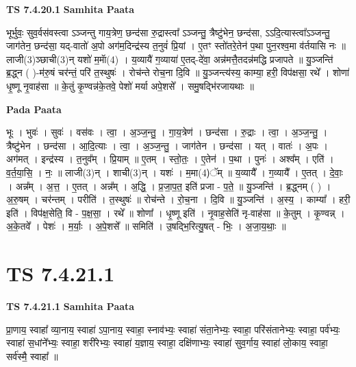 \documentclass[17pt]{extarticle}
\begin{document}
\textbf{TS 7.4.20.1 } \newline
\textbf{Samhita Paata} \newline

भूर्भुवः॒ सुव॒र्वस॑वस्त्वा ऽञ्जन्तु गाय॒त्रेण॒ छन्द॑सा रु॒द्रास्त्वा᳚ ऽञ्जन्तु॒ त्रैष्टु॑भेन॒ छन्द॑सा, ऽऽदि॒त्यास्त्वा᳚ऽञ्जन्तु॒ जाग॑तेन॒ छन्द॑सा॒ यद्-वातो॑ अ॒पो अग॑म॒दिन्द्र॑स्य त॒नुवं॑ प्रि॒यां । ए॒तꣳ स्तो॑तरे॒तेन॑ प॒था पुन॒रश्व॒मा व॑र्तयासि नः ॥ लाजी(3)ञ्छाची(3)न् यशो॑ म॒माॅ(4) । य॒व्यायै॑ ग॒व्याया॑ ए॒तद्-दे॑वा॒ अन्न॑मत्तै॒तदन्न॑मद्धि प्रजापते ॥ यु॒ञ्जन्ति॑ ब्र॒द्ध्न ( )-म॑रु॒षं चर॑न्तं॒ परि॑ त॒स्थुषः॑ । रोच॑न्ते रोच॒ना दि॒वि ॥ यु॒ञ्जन्त्य॑स्य॒ काम्या॒ हरी॒ विप॑क्षसा॒ रथे᳚ । शोणा॑ धृ॒ष्णू नृ॒वाह॑सा ॥ के॒तुं कृ॒ण्वन्न॑के॒तवे॒ पेशो॑ मर्या अपे॒शसे᳚ । समु॒षद्भि॑रजायथाः ॥ \newline

\textbf{Pada Paata} \newline

भूः । भुवः॑ । सुवः॑ । वस॑वः । त्वा॒ । अ॒ञ्ज॒न्तु॒ । गा॒य॒त्रेण॑ । छन्द॑सा । रु॒द्राः । त्वा॒ । अ॒ञ्ज॒न्तु॒ । त्रैष्टु॑भेन । छन्द॑सा । आ॒दि॒त्याः । त्वा॒ । अ॒ञ्ज॒न्तु॒ । जाग॑तेन । छन्द॑सा । यत् । वातः॑ । अ॒पः । अग॑मत् । इन्द्र॑स्य । त॒नुव᳚म् । प्रि॒याम् ॥ ए॒तम् । स्तो॒तः॒ । ए॒तेन॑ । प॒था । पुनः॑ । अश्व᳚म् । एति॑ । व॒र्त॒या॒सि॒ । नः॒ ॥ लाजी(3)न् । शाची(3)न् । यशः॑ । म॒मा(4)ॅम् ॥ य॒व्यायै᳚ । ग॒व्यायै᳚ । ए॒तत् । दे॒वाः॒ । अन्न᳚म् । अ॒त्त॒ । ए॒तत् । अन्न᳚म् । अ॒द्धि॒ । प्र॒जा॒प॒त॒ इति॑ प्रजा - प॒ते॒ ॥ यु॒ञ्जन्ति॑ । ब्र॒द्ध्नम् ( ) । अ॒रु॒षम् । चर॑न्तम् । परीति॑ । त॒स्थुषः॑ ॥ रोच॑न्ते । रो॒च॒ना । दि॒वि ॥ यु॒ञ्जन्ति॑ । अ॒स्य॒ । काम्या᳚ । हरी॒ इति॑ । विप॑क्ष॒सेति॒ वि - प॒क्ष॒सा॒ । रथे᳚ ॥ शोणा᳚ । धृ॒ष्णू इति॑ । नृ॒वाह॒सेति॑ नृ-वाह॑सा ॥ के॒तुम् । कृ॒ण्वन्न् । अ॒के॒तवे᳚ । पेशः॑ । म॒र्याः॒ । अ॒पे॒शसे᳚ ॥ समिति॑ । उ॒षद्भि॒रित्यु॒षत् - भिः॒ । अ॒जा॒य॒थाः॒ ॥  \newline





\section{ TS 7.4.21.1 }

\textbf{TS 7.4.21.1 } \newline
\textbf{Samhita Paata} \newline

प्रा॒णाय॒ स्वाहा᳚ व्या॒नाय॒ स्वाहा॑ ऽपा॒नाय॒ स्वाहा॒ स्नाव॑भ्यः॒ स्वाहा॑ संता॒नेभ्यः॒ स्वाहा॒ परि॑संतानेभ्यः॒ स्वाहा॒ पर्व॑भ्यः॒ स्वाहा॑ स॒धांने᳚भ्यः॒ स्वाहा॒ शरी॑रेभ्यः॒ स्वाहा॑ य॒ज्ञाय॒ स्वाहा॒ दक्षि॑णाभ्यः॒ स्वाहा॑ सुव॒र्गाय॒ स्वाहा॑ लो॒काय॒ स्वाहा॒ सर्व॑स्मै॒ स्वाहा᳚ ॥ \newline
\end{document}
